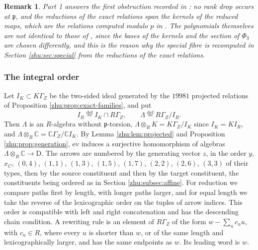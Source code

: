 \documentclass[leqno]{article}
\newcommand{\Cbb}{\ensuremath{\mathbb{C}}}
\newcommand{\D}{\mathrm{D}}
\newcommand{\ot}{\otimes}
\newcommand{\ov}{\overset}
\newtheorem{remark}[thm]{Remark}
\numberwithin{equation}{section}
\begin{document}
\begin{remark} \normalfont
\label{zhu:rem:no-rank-drop}
Part 1 answers the first obstruction recorded in \cite[Remark 11.7]{Arh26}: no rank drop occurs at $\mathfrak p$, and the reductions of the exact relations span the kernels of the reduced maps, which are the relations computed modulo $p$ in \cite[Theorem 11.6]{Arh26}. The polynomials themselves are not identical to those of \cite{Arh26}, since the bases of the kernels and the section of $\Phi_3$ are chosen differently, and this is the reason why the special fibre is recomputed in Section \ref{zhu:sec:special} from the reductions of the exact relations.
\end{remark}

\subsubsection{The integral order}
\label{zhu:subsec:order}

Let $I_K \subset K\Gamma_Z$ be the two-sided ideal generated by the $19981$ projected relations of Proposition \ref{zhu:prop:exact-families}, and put
\[
I_R \ov{\mathrm{def}}{=} I_K \cap R\Gamma_Z, \qquad \Lambda \ov{\mathrm{def}}{=} R\Gamma_Z / I_R.
\]
Then $\Lambda$ is an $R$-algebra without $\mathfrak p$-torsion, $\Lambda \ot_R K = K\Gamma_Z/I_K$ since $I_K = K I_R$, and $\Lambda \ot_R \Cbb = \Cbb\Gamma_Z/\Cbb I_K$. By Lemma \ref{zhu:lem:projected} and Proposition \ref{zhu:prop:generation}, $\mathrm{ev}$ induces a surjective homomorphism of algebras $\Lambda \ot_R \Cbb \to \D$. The arrows are numbered by the generating vector $z$, in the order $y$, $x_C$, $(0,4)$, $(1,1)$, $(1,3)$, $(1,5)$, $(1,7)$, $(2,2)$, $(2,6)$, $(3,3)$ of their types, then by the source constituent and then by the target constituent, the constituents being ordered as in Section \ref{zhu:subsec:affine}. For reduction we compare paths first by length, with longer paths larger, and for equal length we take the reverse of the lexicographic order on the tuples of arrow indices. This order is compatible with left and right concatenation and has the descending chain condition. A rewriting rule is an element of $R\Gamma_Z$ of the form $w - \sum_u c_u u$, with $c_u \in R$, where every $u$ is shorter than $w$, or of the same length and lexicographically larger, and has the same endpoints as $w$. Its leading word is $w$.
\end{document}
